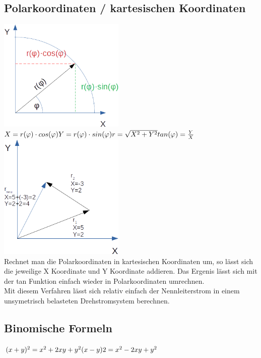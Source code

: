 \documentclass[12pt,a4paper]{article}
\begin{document}
\subsection{Polarkoordinaten / kartesischen Koordinaten}
\includegraphics[width=6cm]{polarkoordinaten.png}\\
$ X=r(\varphi) \cdot cos(\varphi)\\
Y=r(\varphi) \cdot sin(\varphi)\\
r=\sqrt{X^2+Y^2}\\
tan(\varphi)=\frac{Y}{X}\\$
\includegraphics[width=6cm]{pol_add.png}\\
Rechnet man die Polarkoordinaten in kartesischen Koordinaten um, so lässt sich die jeweilige X Koordinate und Y Koordinate addieren. Das Ergenis lässt sich mit der tan Funktion einfach wieder in Polarkoordinaten umrechnen.\\
Mit diesem Verfahren lässt sich relativ einfach der Nennleiterstrom in einem unsymetrisch belasteten Drehstromsystem berechnen. 
\pagebreak
\subsection{Binomische Formeln}
$(x+y)^2=x^2+2xy+y^2\\
(x-y)2=x^2-2xy+y^2$
\end{document}
